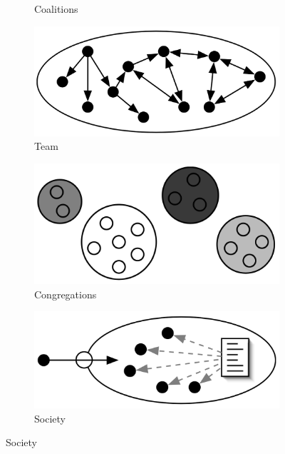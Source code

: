 \begin{figure}
\begin{subfigure}[h]{0.3\linewidth}
        \caption{Coalitions}
        \label{fig:coalitions}
    \end{subfigure}
    \begin{subfigure}[h]{0.3\linewidth}
        \includegraphics[width=\textwidth]{images/orgs/org-teams.png}
        \caption{Team}
        \label{fig:teams}
    \end{subfigure}
    \begin{subfigure}[h]{0.25\linewidth}
        \includegraphics[width=\textwidth]{images/orgs/org-congregations.png}
        \caption{Congregations}
        \label{fig:congregations}
    \end{subfigure}
    \begin{subfigure}[h]{0.3\linewidth}
        \includegraphics[width=\textwidth]{images/orgs/org-societies.png}
        \caption{Society}
        \label{fig:societies}

\end{subfigure}
\end{figure}
